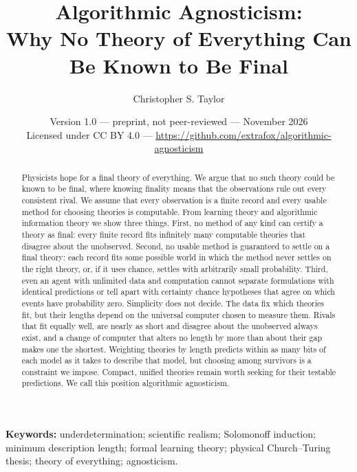 \documentclass[11pt]{article}
\title{Algorithmic Agnosticism:\\
Why No Theory of Everything Can Be Known to Be Final}
\author{Christopher S. Taylor}
\date{Version 1.0 --- preprint, not peer-reviewed --- November 2026\\[0.5ex]
\small Licensed under CC BY 4.0 --- \url{https://github.com/extrafox/algorithmic-agnosticism}}
\theoremstyle{plain}
\theoremstyle{definition}
\theoremstyle{remark}
\begin{document}
\maketitle

\begin{abstract}
Physicists hope for a final theory of everything. We argue that no such
theory could be known to be final, where knowing finality means that the
observations rule out every consistent rival. We assume that every observation is
a finite record and every usable method for choosing theories is computable. From learning theory and algorithmic information
theory we show three things. First, no method of any kind can certify a theory as
final: every finite record fits infinitely many computable theories that disagree about
the unobserved. Second, no usable method is guaranteed to settle on a final theory:
each record fits some possible world in which the method never settles on the right
theory, or, if it uses chance, settles with arbitrarily small probability. Third, even
an agent with unlimited data and computation cannot separate formulations with
identical predictions or tell apart with certainty chance hypotheses that agree on
which events have probability zero. Simplicity does not decide. The data fix which
theories fit, but their lengths depend on the universal computer chosen to measure
them. Rivals that fit equally well, are nearly as short and disagree about the
unobserved always exist, and a change of computer that alters no length by more than about
their gap makes one the shortest. Weighting theories by length predicts within
as many bits of each model as it takes to describe that model, but choosing among survivors is a constraint we impose.
Compact, unified theories remain worth seeking for their testable predictions.
We call this position algorithmic agnosticism.
\end{abstract}

\noindent\textbf{Keywords:} underdetermination; scientific realism; Solomonoff induction;
minimum description length; formal learning theory; physical Church--Turing thesis;
theory of everything; agnosticism.

\tableofcontents













{\raggedright

}
\end{document}
